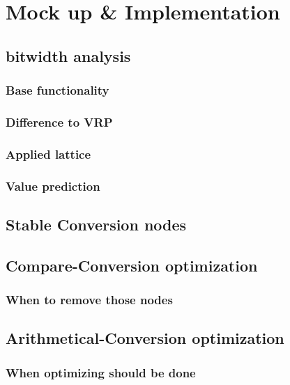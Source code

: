 \chapter{Mock up \& Implementation}\label{sec:impl}

\section{bitwidth analysis}
\subsection{Base functionality}
\subsection{Difference to VRP}
\subsection{Applied lattice}
\subsection{Value prediction}


\section{Stable Conversion nodes}

\section{Compare-Conversion optimization}
\subsection{When to remove those nodes}

\section{Arithmetical-Conversion optimization}
\subsection{When optimizing should be done}